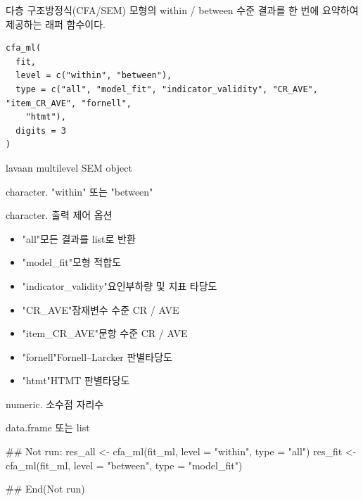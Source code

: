 \documentclass[a4paper]{book}
\begin{document}
%
\begin{Description}
다층 구조방정식(CFA/SEM) 모형의 within / between 수준 결과를
한 번에 요약하여 제공하는 래퍼 함수이다.
\end{Description}
%
\begin{Usage}
\begin{verbatim}
cfa_ml(
  fit,
  level = c("within", "between"),
  type = c("all", "model_fit", "indicator_validity", "CR_AVE", "item_CR_AVE", "fornell",
    "htmt"),
  digits = 3
)
\end{verbatim}
\end{Usage}
%
\begin{Arguments}
\begin{ldescription}
\item[\code{fit}] lavaan multilevel SEM object

\item[\code{level}] character. "within" 또는 "between"

\item[\code{type}] character. 출력 제어 옵션
\begin{itemize}

\item{} "all"모든 결과를 list로 반환
\item{} "model\_fit"모형 적합도
\item{} "indicator\_validity"요인부하량 및 지표 타당도
\item{} "CR\_AVE"잠재변수 수준 CR / AVE
\item{} "item\_CR\_AVE"문항 수준 CR / AVE
\item{} "fornell"Fornell–Larcker 판별타당도
\item{} "htmt"HTMT 판별타당도

\end{itemize}


\item[\code{digits}] numeric. 소수점 자리수
\end{ldescription}
\end{Arguments}
%
\begin{Value}
data.frame 또는 list
\end{Value}
%
\begin{Examples}
\begin{ExampleCode}
\#\# Not run: 
res_all <- cfa_ml(fit_ml, level = "within", type = "all")
res_fit <- cfa_ml(fit_ml, level = "between", type = "model_fit")

## End(Not run)
\end{ExampleCode}
\end{Examples}
\end{document}
